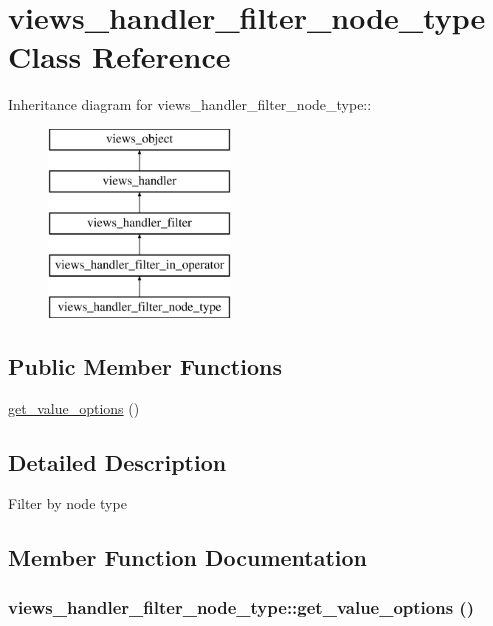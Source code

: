 \hypertarget{classviews__handler__filter__node__type}{
\section{views\_\-handler\_\-filter\_\-node\_\-type Class Reference}
\label{classviews__handler__filter__node__type}
}
Inheritance diagram for views\_\-handler\_\-filter\_\-node\_\-type::\begin{figure}[H]
\begin{center}
\leavevmode
\includegraphics[height=5cm]{classviews__handler__filter__node__type}
\end{center}
\end{figure}
\subsection*{Public Member Functions}
\begin{CompactItemize}
\item 
\hyperlink{classviews__handler__filter__node__type_27870f3af15cf44cae4e3440a3ccce67}{get\_\-value\_\-options} ()
\end{CompactItemize}


\subsection{Detailed Description}
Filter by node type 

\subsection{Member Function Documentation}
\hypertarget{classviews__handler__filter__node__type_27870f3af15cf44cae4e3440a3ccce67}{
\subsubsection[{get\_\-value\_\-options}]{\setlength{\rightskip}{0pt plus 5cm}views\_\-handler\_\-filter\_\-node\_\-type::get\_\-value\_\-options ()}}
\label{classviews__handler__filter__node__type_27870f3af15cf44cae4e3440a3ccce67}


